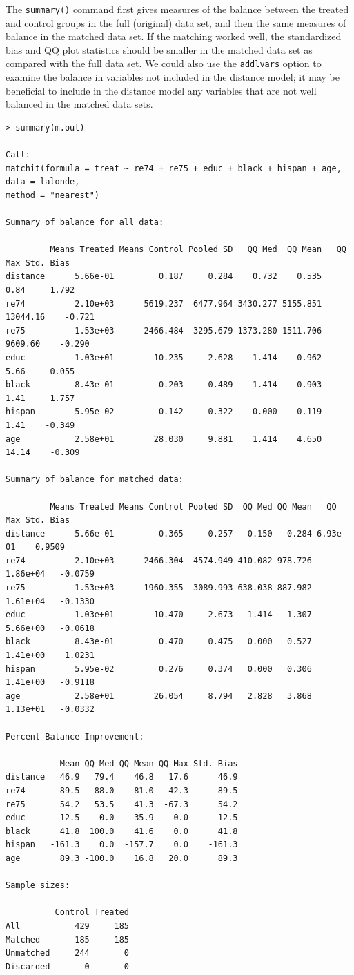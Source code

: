 \documentclass[oneside,letterpaper,titlepage]{article}
\begin{document}
The \texttt{summary()} command first gives measures of the balance
between the treated and control groups in the full (original) data
set, and then the same measures of balance in the matched data set.
If the matching worked well, the standardized bias and QQ plot
statistics should be smaller in the matched data set as compared with
the full data set.  We could also use the \texttt{addlvars} option to
examine the balance in variables not included in the distance model;
it may be beneficial to include in the distance model any variables
that are not well balanced in the matched data sets.
\begin{verbatim}
> summary(m.out)

Call:
matchit(formula = treat ~ re74 + re75 + educ + black + hispan + age, data = lalonde, 
method = "nearest")

Summary of balance for all data:

         Means Treated Means Control Pooled SD   QQ Med  QQ Mean   QQ Max Std. Bias
distance      5.66e-01         0.187     0.284    0.732    0.535     0.84     1.792 
re74          2.10e+03      5619.237  6477.964 3430.277 5155.851 13044.16    -0.721
re75          1.53e+03      2466.484  3295.679 1373.280 1511.706  9609.60    -0.290
educ          1.03e+01        10.235     2.628    1.414    0.962     5.66     0.055
black         8.43e-01         0.203     0.489    1.414    0.903     1.41     1.757
hispan        5.95e-02         0.142     0.322    0.000    0.119     1.41    -0.349
age           2.58e+01        28.030     9.881    1.414    4.650    14.14    -0.309
        
Summary of balance for matched data:

         Means Treated Means Control Pooled SD  QQ Med QQ Mean   QQ Max Std. Bias
distance      5.66e-01         0.365     0.257   0.150   0.284 6.93e-01    0.9509
re74          2.10e+03      2466.304  4574.949 410.082 978.726 1.86e+04   -0.0759
re75          1.53e+03      1960.355  3089.993 638.038 887.982 1.61e+04   -0.1330
educ          1.03e+01        10.470     2.673   1.414   1.307 5.66e+00   -0.0618
black         8.43e-01         0.470     0.475   0.000   0.527 1.41e+00    1.0231
hispan        5.95e-02         0.276     0.374   0.000   0.306 1.41e+00   -0.9118
age           2.58e+01        26.054     8.794   2.828   3.868 1.13e+01   -0.0332
        
Percent Balance Improvement:

           Mean QQ Med QQ Mean QQ Max Std. Bias
distance   46.9   79.4    46.8   17.6      46.9
re74       89.5   88.0    81.0  -42.3      89.5
re75       54.2   53.5    41.3  -67.3      54.2
educ      -12.5    0.0   -35.9    0.0     -12.5
black      41.8  100.0    41.6    0.0      41.8
hispan   -161.3    0.0  -157.7    0.0    -161.3
age        89.3 -100.0    16.8   20.0      89.3

Sample sizes:

          Control Treated
All           429     185
Matched       185     185
Unmatched     244       0
Discarded       0       0
\end{verbatim}
\end{document}
